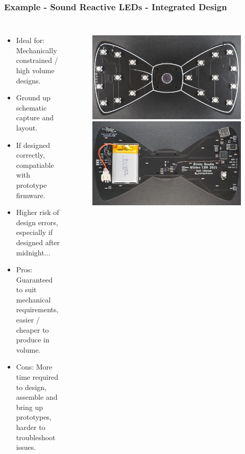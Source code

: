 \documentclass[aspectratio=169, t]{beamer}
\begin{document}
\begin{frame}
\frametitle{Example - Sound Reactive LEDs - Integrated Design}
\vspace{-5mm}
\begin{columns}
	\begin{itemize}
		\item Ideal for: Mechanically constrained / high volume designs.
		\item Ground up schematic capture and layout.
		\item If designed correctly, compatiable with prototype firmware.
		\item Higher risk of design errors, especially if designed after midnight...
		\item Pros: Guaranteed to suit mechanical requirements, easier / cheaper to produce in volume.
		\item Cons: More time required to design, assemble and bring up prototypes, harder to troubleshoot issues.
	\end{itemize}
	\begin{figure}
		\includegraphics[width=0.8\linewidth]{images/bowtie-front.JPG}
		\includegraphics[width=0.8\linewidth]{images/bowtie-back.JPG}
	\end{figure}
\end{columns}
\end{frame}
\end{document}
